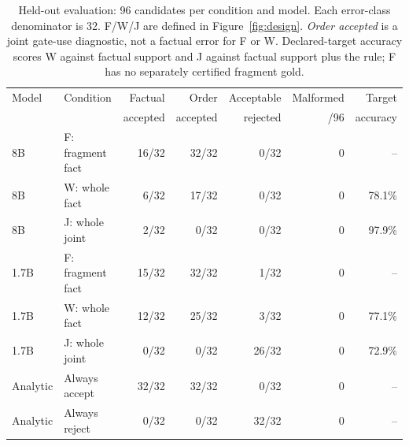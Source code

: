 \documentclass[10pt,letterpaper,twocolumn]{article}
\begin{document}
\begin{table}[t]
\centering\small


\begin{tabular}{@{}llrrrrr@{}}
\toprule
Model & Condition & Factual & Order & Acceptable & Malformed & Target\\
 & & accepted & accepted & rejected & /96 & accuracy\\
\midrule
8B & F: fragment fact & 16/32 & 32/32 & 0/32 & 0 & --\\
8B & W: whole fact & 6/32 & 17/32 & 0/32 & 0 & 78.1\%\\
8B & J: whole joint & 2/32 & 0/32 & 0/32 & 0 & 97.9\%\\
\midrule
1.7B & F: fragment fact & 15/32 & 32/32 & 1/32 & 0 & --\\
1.7B & W: whole fact & 12/32 & 25/32 & 3/32 & 0 & 77.1\%\\
1.7B & J: whole joint & 0/32 & 0/32 & 26/32 & 0 & 72.9\%\\
\midrule
Analytic & Always accept & 32/32 & 32/32 & 0/32 & 0 & --\\
Analytic & Always reject & 0/32 & 0/32 & 32/32 & 0 & --\\
\bottomrule
\end{tabular}
\caption{Held-out evaluation: 96 candidates per condition and model. Each error-class denominator is 32. F/W/J are defined in Figure~\ref{fig:design}. \emph{Order accepted} is a joint gate-use diagnostic, not a factual error for F or W. Declared-target accuracy scores W against factual support and J against factual support plus the rule; F has no separately certified fragment gold.}
\label{tab:primary}
\end{table}
\end{document}
